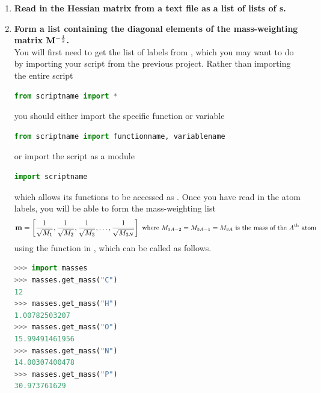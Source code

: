 \documentclass[11pt]{article}
\begin{document}
\begin{enumerate}[label=\textbf{\arabic*}]
\item {\bf Read in the Hessian matrix from a text file as a list of lists of s. }\\
\item {\bf Form a list containing the diagonal elements of the mass-weighting matrix $\mathbf{M}^{-\frac{1}{2}}$. }\\
You will first need to get the list of labels from , which you may want to do by importing your script from the previous project.
Rather than importing the entire script
\begin{addmargin}{2cm}{}
\begin{lstlisting}[language=python]
from scriptname import *
\end{lstlisting}
\end{addmargin}
you should either import the specific function or variable
\begin{addmargin}{2cm}{}
\begin{lstlisting}[language=python]
from scriptname import functionname, variablename
\end{lstlisting}
\end{addmargin}
or import the script as a module
\begin{addmargin}{2cm}{}
\begin{lstlisting}[language=python]
import scriptname
\end{lstlisting}
\end{addmargin}
which allows its functions to be accessed as .
Once you have read in the atom labels, you will be able to form the mass-weighting list
\begin{align*}
	\mathbf{m}
=
\left[
	\dfrac{1}{\sqrt{M_1}},
	\dfrac{1}{\sqrt{M_2}},
	\dfrac{1}{\sqrt{M_3}},\ldots,
	\dfrac{1}{\sqrt{M_{3N}}} \right]
	\text{\small\ where $M_{3A-2} = M_{3A-1} = M_{3A}$ is the mass of the $A$\ensuremath{^\text{th}}\ atom}
\end{align*}
using the  function in , which can be called as follows.
\begin{addmargin}{2cm}{}
\begin{lstlisting}[language=python]
>>> import masses
>>> masses.get_mass("C")
12
>>> masses.get_mass("H")
1.00782503207
>>> masses.get_mass("O")
15.99491461956
>>> masses.get_mass("N")
14.00307400478
>>> masses.get_mass("P")
30.973761629
\end{lstlisting}

\end{addmargin}
\end{enumerate}
\end{document}
